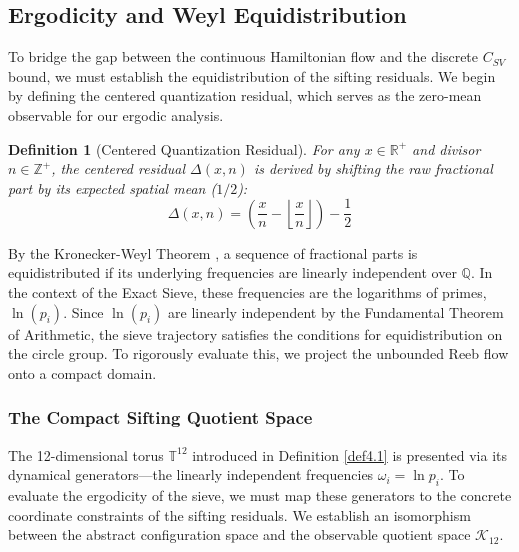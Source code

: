 \documentclass[sn-mathphys-num, pdflatex, referee]{sn-jnl}
\newtheorem{definition}[theorem]{Definition}
\begin{document}
\subsection{Ergodicity and Weyl Equidistribution}

To bridge the gap between the continuous Hamiltonian flow and the discrete $C_{SV}$ bound, we must establish the equidistribution of the sifting residuals. We begin by defining the centered quantization residual, which serves as the zero-mean observable for our ergodic analysis.

\begin{definition}[Centered Quantization Residual]
For any $x \in \mathbb{R}^+$ and divisor $n \in \mathbb{Z}^+$, the centered residual $\Delta(x, n)$ is derived by shifting the raw fractional part by its expected spatial mean ($1/2$):
\begin{equation}
\Delta(x, n) = \left( \frac{x}{n} - \left\lfloor \frac{x}{n} \right\rfloor \right) - \frac{1}{2}
\label{eq:centered_delta}
\end{equation}
\end{definition}

By the Kronecker-Weyl Theorem \cite{weyl}, a sequence of fractional parts is equidistributed if its underlying frequencies are linearly independent over $\mathbb{Q}$. In the context of the Exact Sieve, these frequencies are the logarithms of primes, $\ln(p_i)$. Since $\ln(p_i)$ are linearly independent by the Fundamental Theorem of Arithmetic, the sieve trajectory satisfies the conditions for equidistribution on the circle group. To rigorously evaluate this, we project the unbounded Reeb flow onto a compact domain.

\subsubsection{The Compact Sifting Quotient Space}
\label{def:quotient_space}

The 12-dimensional torus $\mathbb{T}^{12}$ introduced in Definition \ref{def4.1} is presented via its dynamical generators—the linearly independent frequencies $\omega_i = \ln p_i$. To evaluate the ergodicity of the sieve, we must map these generators to the concrete coordinate constraints of the sifting residuals. We establish an isomorphism between the abstract configuration space and the observable quotient space $\mathcal{K}_{12}$.
\end{document}
